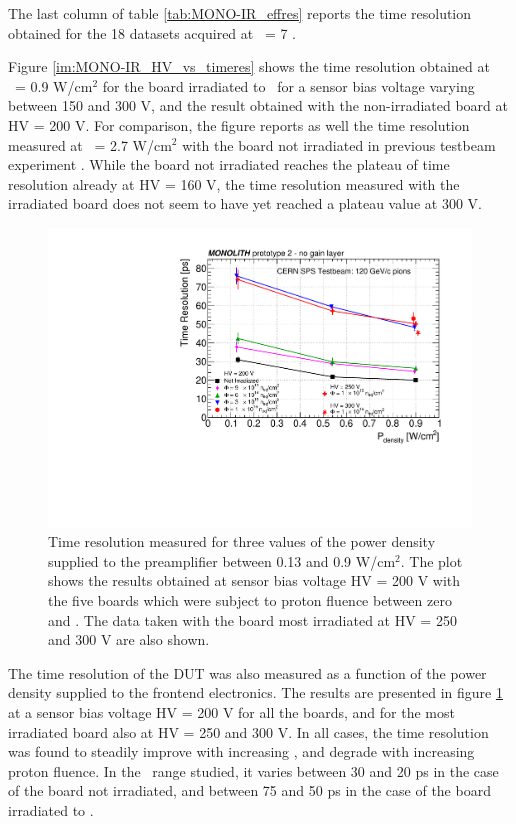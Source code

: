 		The last column of table \ref{tab:MONO-IR_effres} reports the time resolution obtained for the 18 datasets acquired at \vth~= 7 \noise.  

		Figure \ref{im:MONO-IR_HV_vs_timeres} shows the time resolution obtained at \power~= 0.9 W/cm$^2$ for the board irradiated to \maxflu~for a sensor bias voltage varying between 150 and 300 V, and the result obtained with the non-irradiated board at HV = 200 V. For comparison, the figure reports as well the time resolution measured at \power~= 2.7 W/cm$^2$ with the board not irradiated in previous testbeam experiment \cite{Monolith_20ps}.
		While the board not irradiated reaches the plateau of time resolution already at HV = 160 V, the time resolution measured with the irradiated board does not seem to have yet reached a plateau value at 300 V.

		\begin{figure}[h]
			\centering
			\includegraphics[width=.75\textwidth]{files/MONOLITH_Irradiated_paper/Power_timeresolution.pdf}
			\caption{Time resolution measured for three values of the  power density supplied to the preamplifier between 0.13 and 0.9 W/cm$^2$. The plot shows the results obtained at sensor bias voltage HV = 200 V with the five boards which were subject to proton fluence between zero and \maxflu. The data taken with the board most irradiated  at HV = 250 and 300 V are also shown.}
			\label{im:MONO-IR_power_vs_timeres}
		\end{figure}

		The time resolution of the DUT was also measured as a function of the power density supplied to the frontend electronics. The results are presented in figure \ref{im:MONO-IR_power_vs_timeres} at a sensor bias voltage HV = 200 V for all the boards, and for the most irradiated board also at HV = 250 and 300 V. In all cases, the time resolution was found to steadily improve with increasing \power, and degrade with increasing proton fluence. In the \power~range studied, it varies between 30 and 20 ps in the case of the board not irradiated, and between 75 and  50 ps in the case of the board irradiated to \maxflu.

